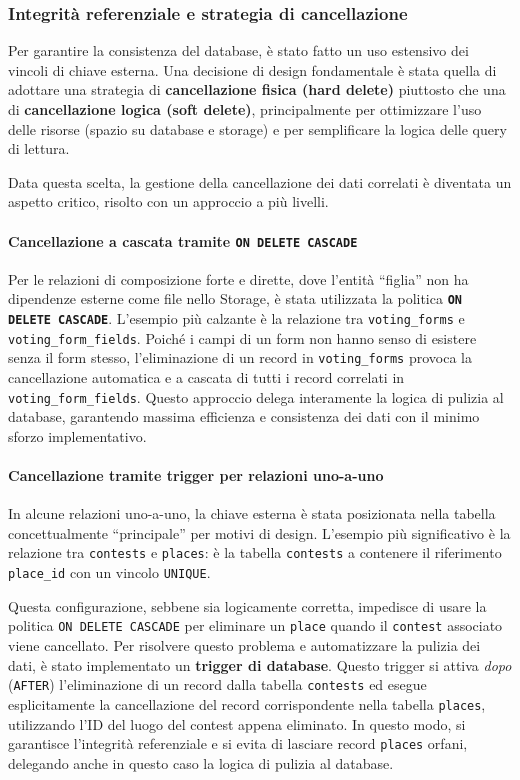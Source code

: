 \subsubsection{Integrità referenziale e strategia di cancellazione}
Per garantire la consistenza del database, è stato fatto un uso estensivo dei vincoli di chiave esterna.
Una decisione di design fondamentale è stata quella di adottare una strategia di \textbf{cancellazione fisica (hard delete)} piuttosto che una di \textbf{cancellazione logica (soft delete)}, principalmente per ottimizzare l'uso delle risorse (spazio su database e storage) e per semplificare la logica delle query di lettura.

Data questa scelta, la gestione della cancellazione dei dati correlati è diventata un aspetto critico, risolto con un approccio a più livelli.

\paragraph{Cancellazione a cascata tramite \texttt{ON DELETE CASCADE}}
Per le relazioni di composizione forte e dirette, dove l'entità ``figlia'' non ha dipendenze esterne come file nello Storage, è stata utilizzata la politica \textbf{\texttt{ON DELETE CASCADE}}.
L'esempio più calzante è la relazione tra \texttt{voting\_forms} e \texttt{voting\_form\_fields}.
Poiché i campi di un form non hanno senso di esistere senza il form stesso, l'eliminazione di un record in \texttt{voting\_forms} provoca la cancellazione automatica e a cascata di tutti i record correlati in \texttt{voting\_form\_fields}.
Questo approccio delega interamente la logica di pulizia al database, garantendo massima efficienza e consistenza dei dati con il minimo sforzo implementativo.

\paragraph{Cancellazione tramite trigger per relazioni uno-a-uno}
In alcune relazioni uno-a-uno, la chiave esterna è stata posizionata nella tabella concettualmente ``principale'' per motivi di design.
L'esempio più significativo è la relazione tra \texttt{contests} e \texttt{places}: è la tabella \texttt{contests} a contenere il riferimento \texttt{place\_id} con un vincolo \texttt{UNIQUE}.

Questa configurazione, sebbene sia logicamente corretta, impedisce di usare la politica \texttt{ON DELETE CASCADE} per eliminare un \texttt{place} quando il \texttt{contest} associato viene cancellato.
Per risolvere questo problema e automatizzare la pulizia dei dati, è stato implementato un \textbf{trigger di database}.
Questo trigger si attiva \emph{dopo} (\texttt{AFTER}) l'eliminazione di un record dalla tabella \texttt{contests} ed esegue esplicitamente la cancellazione del record corrispondente nella tabella \texttt{places}, utilizzando l'ID del luogo del contest appena eliminato.
In questo modo, si garantisce l'integrità referenziale e si evita di lasciare record \texttt{places} orfani, delegando anche in questo caso la logica di pulizia al database.

